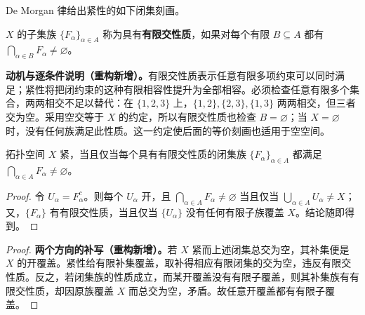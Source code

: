 \documentclass[../../main.tex]{subfiles}%
\begin{document}
De Morgan 律给出紧性的如下闭集刻画。
\begin{definition}[有限交性质]\label{definition:ch04-finite-intersection-property}
$X$ 的子集族 $\{F_\alpha\}_{\alpha\in A}$ 称为具有\textbf{有限交性质}，如果对每个有限 $B\subseteq A$ 都有 $\bigcap_{\alpha\in B}F_\alpha\ne\varnothing$。
\end{definition}
\begin{remark}
\textbf{动机与逐条件说明（重构新增）。}有限交性质表示任意有限多项约束可以同时满足；紧性将把闭约束的这种有限相容性提升为全部相容。必须检查任意有限多个集合，两两相交不足以替代：在 $\{1,2,3\}$ 上，$\{1,2\},\{2,3\},\{1,3\}$ 两两相交，但三者交为空。采用空交等于 $X$ 的约定，所以有限交性质也检查 $B=\varnothing$；当 $X=\varnothing$ 时，没有任何族满足此性质。这一约定使后面的等价刻画也适用于空空间。
\end{remark}
\begin{proposition}\label{proposition:ch04-compact-fip}
拓扑空间 $X$ 紧，当且仅当每个具有有限交性质的闭集族 $\{F_\alpha\}_{\alpha\in A}$ 都满足 $\bigcap_{\alpha\in A}F_\alpha\ne\varnothing$。
\end{proposition}
\begin{proof}
令 $U_\alpha=F_\alpha^c$。则每个 $U_\alpha$ 开，且 $\bigcap_{\alpha\in A}F_\alpha\ne\varnothing$ 当且仅当 $\bigcup_{\alpha\in A}U_\alpha\ne X$；又，$\{F_\alpha\}$ 有有限交性质，当且仅当 $\{U_\alpha\}$ 没有任何有限子族覆盖 $X$。结论随即得到。
\end{proof}
\begin{proof}
\textbf{两个方向的补写（重构新增）。}若 $X$ 紧而上述闭集总交为空，其补集便是 $X$ 的开覆盖。紧性给有限补集覆盖，取补得相应有限闭集的交为空，违反有限交性质。反之，若闭集族的性质成立，而某开覆盖没有有限子覆盖，则其补集族有有限交性质，却因原族覆盖 $X$ 而总交为空，矛盾。故任意开覆盖都有有限子覆盖。
\end{proof}
\end{document}
